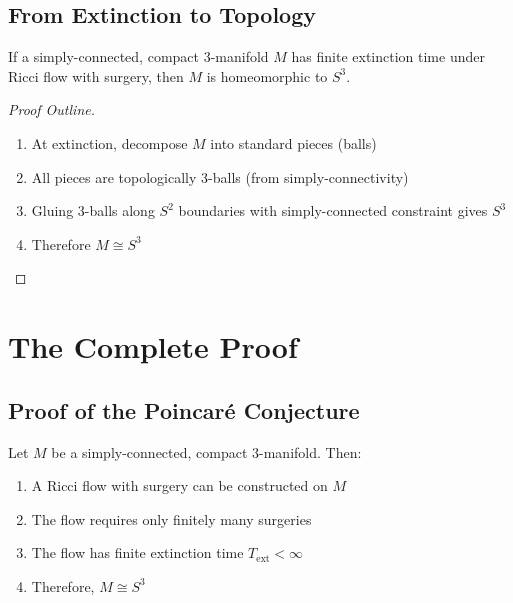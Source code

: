 \section{From Extinction to Topology}

\begin{theorem}
\label{thm:extinction_implies_s3}
\leanok
{}
If a simply-connected, compact 3-manifold $M$ has finite extinction time under Ricci flow with surgery, then $M$ is homeomorphic to $S^3$.
\end{theorem}

\begin{proof}[Proof Outline]
\begin{enumerate}
\item At extinction, decompose $M$ into standard pieces (balls)
\item All pieces are topologically 3-balls (from simply-connectivity)
\item Gluing 3-balls along $S^2$ boundaries with simply-connected constraint gives $S^3$
\item Therefore $M \cong S^3$
\end{enumerate}
\end{proof}

\chapter{The Complete Proof}
\label{chap:complete_proof}

\section{Proof of the Poincaré Conjecture}

\begin{theorem}
\label{thm:poincare_complete}
\leanok
{}
Let $M$ be a simply-connected, compact 3-manifold. Then:
\begin{enumerate}
\item A Ricci flow with surgery can be constructed on $M$
\item The flow requires only finitely many surgeries
\item The flow has finite extinction time $T_{\text{ext}} < \infty$
\item Therefore, $M \cong S^3$
\end{enumerate}
\end{theorem}

